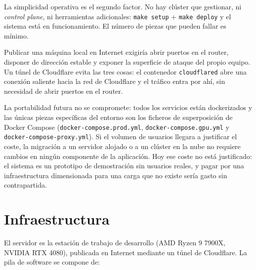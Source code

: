 La simplicidad operativa es el segundo factor. No hay clúster que gestionar, ni \emph{control plane}, ni herramientas adicionales: \texttt{make setup} + \texttt{make deploy} y el sistema está en funcionamiento. El número de piezas que pueden fallar es mínimo.

Publicar una máquina local en Internet exigiría abrir puertos en el router, disponer de dirección estable y exponer la superficie de ataque del propio equipo. Un túnel de Cloudflare evita las tres cosas: el contenedor \texttt{cloudflared} abre una conexión saliente hacia la red de Cloudflare y el tráfico entra por ahí, sin necesidad de abrir puertos en el router.

La portabilidad futura no se compromete: todos los servicios están dockerizados y las únicas piezas específicas del entorno son los ficheros de superposición de Docker Compose (\texttt{docker-compose.prod.yml}, \texttt{docker-compose.gpu.yml} y \texttt{docker-compose-proxy.yml}). Si el volumen de usuarios llegara a justificar el coste, la migración a un servidor alojado o a un clúster en la nube no requiere cambios en ningún componente de la aplicación. Hoy ese coste no está justificado: el sistema es un prototipo de demostración sin usuarios reales, y pagar por una infraestructura dimensionada para una carga que no existe sería gasto sin contrapartida.

\section{Infraestructura}

El servidor es la estación de trabajo de desarrollo (AMD Ryzen 9 7900X, NVIDIA RTX 4080), publicada en Internet mediante un túnel de Cloudflare. La pila de software se compone de:

